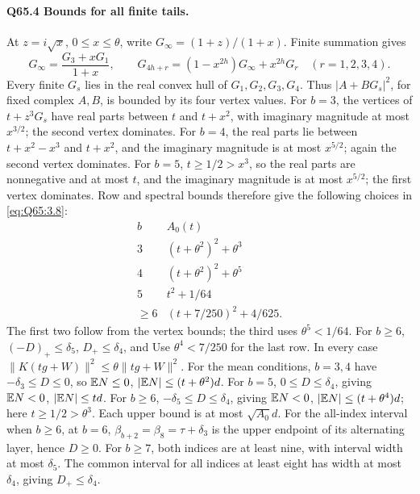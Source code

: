 \paragraph{Q65.4 Bounds for all finite tails.}
At \(z=\allowbreak i\sqrt x\), \(0\le\allowbreak  x\le\allowbreak \theta\), write
\(G_\infty=\allowbreak (1+z)/(1+x)\). Finite summation gives
\begin{equation}\tag{Q65.4.1}\label{eq:Q65:4.1}
G_\infty=\frac{G_3+xG_1}{1+x},\qquad
G_{4h+r}=(1-x^{2h})G_\infty+x^{2h}G_r
\quad(r=1,2,3,4).
\end{equation}
Every finite \(G_s\) lies in the real convex hull of
\(G_1,\allowbreak G_2,\allowbreak G_3,\allowbreak G_4\). Thus \(|A+BG_s|^2\), for fixed complex
\(A,\allowbreak B\), is bounded by its four vertex values.
For \(b=\allowbreak 3\), the vertices of \(t+z^3G_s\) have real parts between
\(t\) and \(t+x^2\), with imaginary magnitude at most \(x^{3/2}\);
the second vertex dominates. For \(b=\allowbreak 4\), the real parts lie between
\(t+x^2-x^3\) and \(t+x^2\), and the imaginary magnitude is at most
\(x^{5/2}\); again the second vertex dominates.
For \(b=\allowbreak 5\), \(t\ge\allowbreak 1/2>\allowbreak x^3\), so the real parts are nonnegative
and at most \(t\), and the imaginary magnitude is at most \(x^{5/2}\);
the first vertex dominates. Row and spectral bounds therefore give
the following choices in \eqref{eq:Q65:3.8}:
\begin{equation}\tag{Q65.4.2}\label{eq:Q65:4.2}
\begin{array}{c|c}
b&A_0(t)\\\hline
3&(t+\theta^2)^2+\theta^3\\
4&(t+\theta^2)^2+\theta^5\\
5&t^2+1/64\\
\ge6&(t+7/250)^2+4/625.
\end{array}
\end{equation}
The first two follow from the vertex bounds; the third uses
\(\theta^5<\allowbreak 1/64\). For \(b\ge\allowbreak 6\),
\((-D)_+\le\allowbreak \delta_5\), \(D_+\le\allowbreak \delta_4\), and
Use \(\theta^4<\allowbreak 7/250\) for the last row.
In every case \(\|K(tg+W)\|^2\le\allowbreak \theta\|tg+W\|^2\).
For the mean conditions, \(b=\allowbreak 3,\allowbreak 4\) have
\(-\delta_3\le\allowbreak  D\le\allowbreak 0\), so
\(\mathbb E N\le\allowbreak 0\), \(|\mathbb E N|\le\allowbreak (t+\theta^2)d\).
For \(b=\allowbreak 5\), \(0\le\allowbreak  D\le\allowbreak \delta_4\), giving
\(\mathbb E N<\allowbreak 0\), \(|\mathbb E N|\le\allowbreak  td\).
For \(b\ge\allowbreak 6\), \(-\delta_5\le\allowbreak  D\le\allowbreak \delta_4\), giving
\(\mathbb E N<\allowbreak 0\), \(|\mathbb E N|\le\allowbreak (t+\theta^4)d\); here \(t\ge\allowbreak 1/2>\allowbreak \theta^3\).
Each upper bound is at most \(\sqrt{A_0}d\).
For the all-index interval when \(b\ge\allowbreak 6\), at \(b=\allowbreak 6\),
\(\beta_{b+2}=\allowbreak \beta_8=\allowbreak \tau+\delta_3\) is the upper endpoint of
its alternating layer, hence \(D\ge\allowbreak 0\). For \(b\ge\allowbreak 7\), both indices
are at least nine, with interval width at most \(\delta_5\).
The common interval for all indices at least eight has width at most
\(\delta_4\), giving \(D_+\le\allowbreak \delta_4\).


